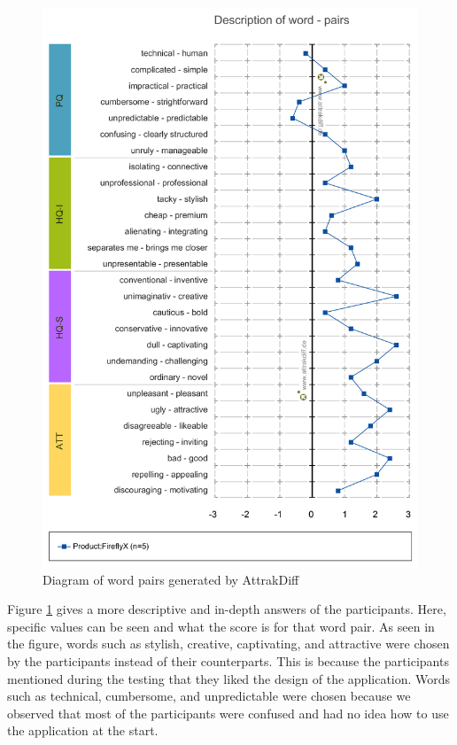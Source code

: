 \begin{figure}[H]
    \centering
    \includegraphics[width=12cm]{figures/NewFigures/Description_of_word-pairs.png}
    \caption{Diagram of word pairs generated by AttrakDiff}
    \label{fig:DiagramOfWordPairs}
\end{figure}

Figure \ref{fig:DiagramOfWordPairs} gives a more descriptive and in-depth answers of the participants. Here, specific values can be seen and what the score is for that word pair. As seen in the figure, words such as stylish, creative, captivating, and attractive were chosen by the participants instead of their counterparts. This is because the participants mentioned during the testing that they liked the design of the application. Words such as technical, cumbersome, and unpredictable were chosen because we observed that most of the participants were confused and had no idea how to use the application at the start.

